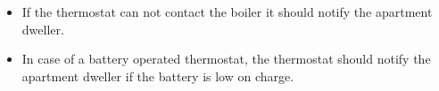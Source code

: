 
\begin{itemize}
\item If the thermostat can not contact the boiler it should notify the apartment dweller.  
\item In case of a battery operated thermostat, the thermostat should notify the apartment dweller if the battery is low on charge.
\end{itemize}
